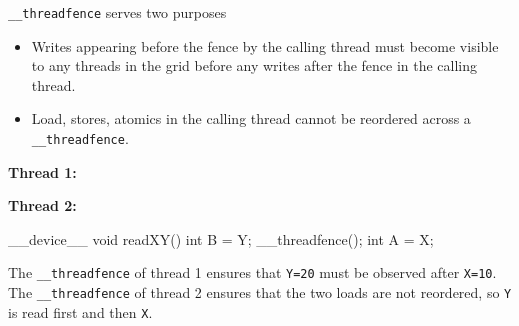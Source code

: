    \begin{tcolorbox}[gris]
        \texttt{\_\_threadfence} serves two purposes
        \begin{itemize}[left=10pt, label=\textbullet]
            \item Writes appearing before the fence by the calling thread must become visible to any threads in the grid before any writes after the fence in the calling thread.
            \item Load, stores, atomics in the calling thread cannot be reordered across a \texttt{\_\_threadfence}.
        \end{itemize}
    \end{tcolorbox}
    \begin{center}
    \begin{minipage}{0.45\textwidth}
    \begin{center}
        \textbf{Thread 1:}
        \begin{codeCenter}
        \begin{Ccode}
__device__ void writeXY()

    X = 10;
    __threadfence();
    Y = 20;
}
        \end{Ccode}
        \end{codeCenter}
    \end{center}
    \end{minipage}
    \hfill
    \begin{minipage}{0.45\textwidth}
        \begin{center}
            \textbf{Thread 2:}
            \begin{codeCenter}
            \begin{Ccode}
__device__ void readXY()
{
    int B = Y;
    __threadfence();
    int A = X;
}
            \end{Ccode}
            \end{codeCenter}
        \end{center}
    \end{minipage}
    \end{center}
    The \texttt{\_\_threadfence} of thread 1 ensures that \texttt{Y=20} must be observed after \texttt{X=10}. The \texttt{\_\_threadfence} of thread 2 ensures that the two loads are not reordered, so \texttt{Y} is read first and then \texttt{X}.
